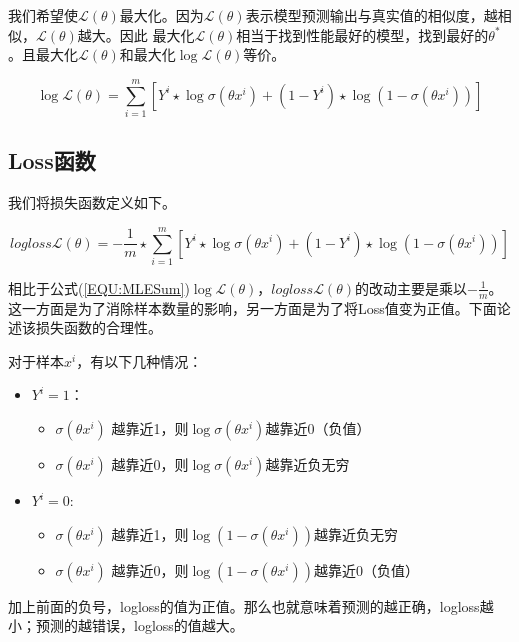 \documentclass{article}
\begin{document}
我们希望使$\mathcal{L}(\theta)$最大化。因为$\mathcal{L}(\theta)$表示模型预测输出与真实值的相似度，越相似，$\mathcal{L}(\theta)$越大。因此 最大化$\mathcal{L}(\theta)$相当于找到性能最好的模型，找到最好的$\theta^{*}$。且最大化$\mathcal{L}(\theta)$和最大化$\log \mathcal{L}(\theta)$等价。

\begin{equation}
    \log \mathcal{L}(\theta) = \sum^m_{i=1} \left[ Y^i \star \log \sigma(\theta x^i) + (1-Y^i) \star \log (1-\sigma(\theta x^i))  \right]
    \label{EQU:MLESum}
\end{equation}

\subsection{Loss函数}

我们将损失函数定义如下。


\begin{equation}
    logloss \mathcal{L}(\theta) = -\frac{1}{m} \star \sum^m_{i=1} \left[ Y^i \star \log \sigma(\theta x^i) + (1-Y^i) \star \log (1-\sigma(\theta x^i))  \right]
    \label{EQU:LogLoss}
\end{equation}

相比于公式(\ref{EQU:MLESum})$\log \mathcal{L}(\theta)$，$logloss \mathcal{L}(\theta)$的改动主要是乘以$-\frac{1}{m}$。这一方面是为了消除样本数量的影响，另一方面是为了将Loss值变为正值。下面论述该损失函数的合理性。

对于样本$x^i$，有以下几种情况：
\renewcommand{\labelitemi}{$\bullet$}
\renewcommand{\labelitemii}{$\diamond$}
\begin{itemize}
    \item $Y^i=1$：
    \begin{itemize}
        \item $\sigma(\theta x^i)$ 越靠近1，则$\log \sigma(\theta x^i)$越靠近0（负值）
        \item $\sigma(\theta x^i)$ 越靠近0，则$\log \sigma(\theta x^i)$越靠近负无穷
    \end{itemize}
    \item $Y^i=0$:
    \begin{itemize}
        \item $\sigma(\theta x^i)$ 越靠近1，则$\log (1- \sigma(\theta x^i))$越靠近负无穷
        \item $\sigma(\theta x^i)$ 越靠近0，则$\log (1- \sigma(\theta x^i))$越靠近0（负值）
    \end{itemize}
\end{itemize}
加上前面的负号，logloss的值为正值。那么也就意味着预测的越正确，logloss越小；预测的越错误，logloss的值越大。
\end{document}
